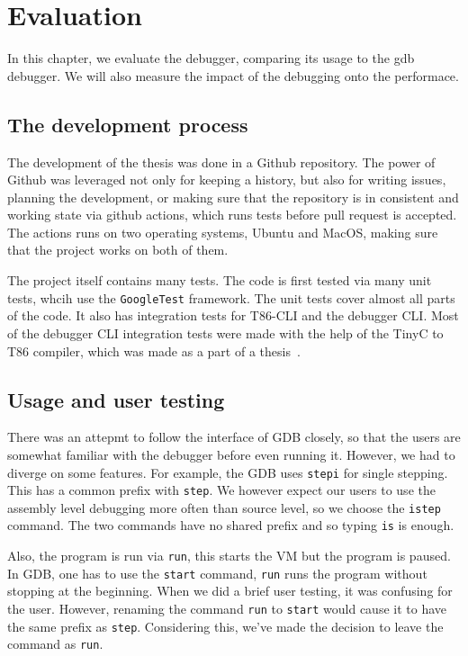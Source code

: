 \chapter{Evaluation}
In this chapter, we evaluate the debugger, comparing its usage to the gdb
debugger. We will also measure the impact of the debugging onto the performace.

\section{The development process}
The development of the thesis was done in a Github repository. The power of
Github was leveraged not only for keeping a history, but also for writing
issues, planning the development, or making sure that the repository is in
consistent and working state via github actions, which runs tests before pull
request is accepted. The actions runs on two operating systems, Ubuntu and
MacOS, making sure that the project works on both of them.

The project itself contains many tests. The code is first tested via many unit
tests, whcih use the \texttt{GoogleTest} framework. The unit tests cover almost
all parts of the code. It also has integration tests for T86-CLI and the
debugger CLI. Most of the debugger CLI integration tests were made with the
help of the TinyC to T86 compiler, which was made as a part of a
thesis~.

\section{Usage and user testing}
There was an attepmt to follow the interface of GDB closely, so that the users
are somewhat familiar with the debugger before even running it. However, we had
to diverge on some features. For example, the GDB uses \texttt{stepi} for
single stepping. This has a common prefix with \texttt{step}. We however expect
our users to use the assembly level debugging more often than source level, so
we choose the \texttt{istep} command. The two commands have no shared prefix
and so typing \texttt{is} is enough.

Also, the program is run via \texttt{run}, this starts the VM but the program
is paused. In GDB, one has to use the \texttt{start} command, \texttt{run} runs
the program without stopping at the beginning. When we did a brief user
testing, it was confusing for the user. However, renaming the command
\texttt{run} to \texttt{start} would cause it to have the same prefix as
\texttt{step}. Considering this, we've made the decision to leave the command
as \texttt{run}.


